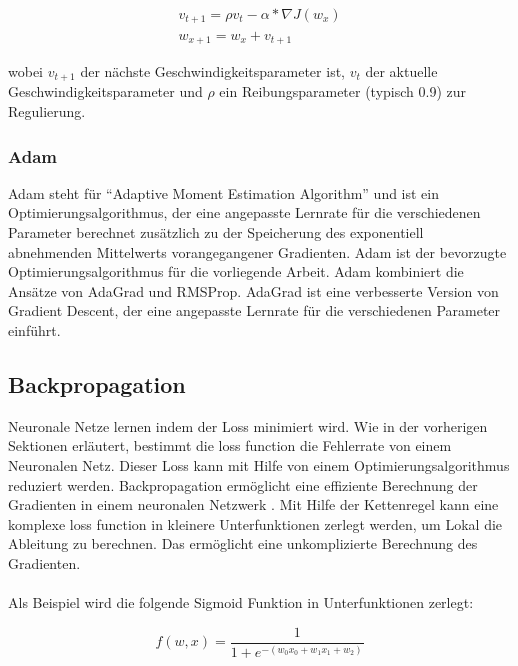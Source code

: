 \begin{equation}
  \begin{gathered}
    v_{t+1} = \rho v_t - \alpha * \nabla J(w_x) \\
    w_{x+1} = w_x + v_{t+1}
  \end{gathered}
\end{equation}

wobei $v_{t+1}$ der nächste Geschwindigkeitsparameter ist, $v_t$ der aktuelle Geschwindigkeitsparameter und $\rho$ ein Reibungsparameter
(typisch 0.9) zur Regulierung.

\subsubsection{Adam}
Adam steht für ``Adaptive Moment Estimation Algorithm'' und ist ein Optimierungsalgorithmus, der eine angepasste Lernrate für die verschiedenen
Parameter berechnet \cite{kingma2014adam} zusätzlich zu der Speicherung des exponentiell abnehmenden Mittelwerts vorangegangener Gradienten.
Adam ist der bevorzugte Optimierungsalgorithmus für die vorliegende Arbeit.
Adam kombiniert die Ansätze von AdaGrad \cite{duchi2011adaptive} und RMSProp. AdaGrad ist eine
verbesserte Version von Gradient Descent, der eine angepasste Lernrate für die verschiedenen Parameter einführt.

\subsection{Backpropagation}\label{subsection:backpropagation}
Neuronale Netze lernen indem der Loss minimiert wird. Wie in der vorherigen Sektionen erläutert, bestimmt die \gls{loss function}
die Fehlerrate von einem Neuronalen Netz. Dieser Loss kann mit Hilfe von einem Optimierungsalgorithmus reduziert werden.
Backpropagation ermöglicht eine effiziente Berechnung der Gradienten in einem neuronalen Netzwerk \cite{was-ist-backpropagation}.
Mit Hilfe der Kettenregel kann eine komplexe \gls{loss function} in kleinere Unterfunktionen zerlegt werden, um Lokal die Ableitung zu berechnen.
Das ermöglicht eine unkomplizierte Berechnung des Gradienten.
\\
\\
Als Beispiel wird die folgende Sigmoid Funktion in Unterfunktionen zerlegt:

\begin{equation}
  f(w,x) = \frac{1}{1+e^{-(w_0 x_0 + w_1 x_1 + w_2)}}
\end{equation}

